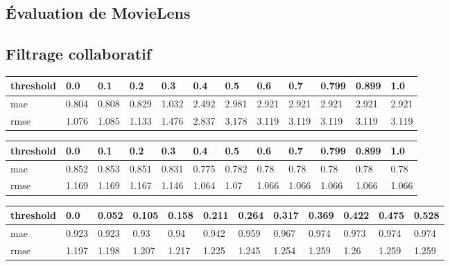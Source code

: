 \thispagestyle{empty}
\setcounter{table}{1}
\begin{appendices}
\section*{Évaluation de MovieLens}
\subsection*{Filtrage collaboratif}
\begin{center}\label{tab30}
	\begin{tabularx}{\textwidth}{|l|X|X|X|X|X|X|X|X|X|X|X|}
		\hline
		threshold & 0.0 & 0.1 & 0.2 & 0.3 & 0.4 & 0.5 & 0.6 & 0.7 & 0.799 & 0.899 & 1.0 \\ \hline
		mae & 0.804 & 0.808 & 0.829 & 1.032 & 2.492 & 2.981 & 2.921 & 2.921 & 2.921 & 2.921 & 2.921 \\ \hline
		rmse & 1.076 & 1.085 & 1.133 & 1.476 & 2.837 & 3.178 & 3.119 & 3.119 & 3.119 & 3.119 & 3.119 \\ \hline				
	\end{tabularx}	
\end{center}

\begin{center}\label{tab31}
	\begin{tabularx}{\textwidth}{|l|X|X|X|X|X|X|X|X|X|X|X|}
		\hline
		threshold & 0.0 & 0.1 & 0.2 & 0.3 & 0.4 & 0.5 & 0.6 & 0.7 & 0.799 & 0.899 & 1.0 \\ \hline
		mae & 0.852 & 0.853 & 0.851 & 0.831 & 0.775 & 0.782 & 0.78 & 0.78 & 0.78 & 0.78 & 0.78 \\ \hline
		rmse & 1.169 & 1.169 & 1.167 & 1.146 & 1.064 & 1.07 & 1.066 & 1.066 & 1.066 & 1.066 & 1.066 \\ \hline
	\end{tabularx}	
\end{center}


\begin{center}\label{tab3}
	\begin{tabularx}{\textwidth}{|l|X|X|X|X|X|X|X|X|X|X|X|}
		\hline
		threshold & 0.0 & 0.052 & 0.105 & 0.158 & 0.211 & 0.264 & 0.317 & 0.369 & 0.422 & 0.475 & 0.528 \\ \hline
		mae & 0.923 & 0.923 & 0.93 & 0.94 & 0.942 & 0.959 & 0.967 & 0.974 & 0.973 & 0.974 & 0.974 \\ \hline
		rmse & 1.197 & 1.198 & 1.207 & 1.217 & 1.225 & 1.245 & 1.254 & 1.259 & 1.26 & 1.259 & 1.259 \\ \hline
	\end{tabularx}	
\end{center}


\end{appendices}
